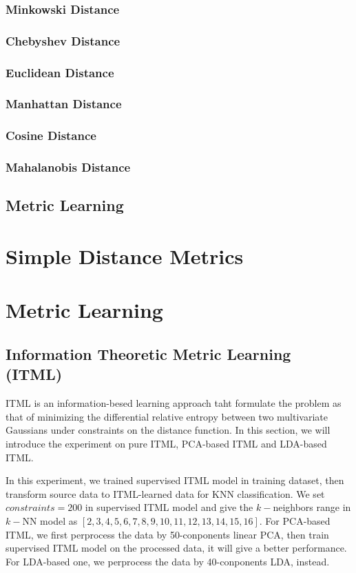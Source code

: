 \documentclass[conference]{IEEEtran}
\begin{document}
\subsubsection{Minkowski Distance}
\subsubsection{Chebyshev Distance}
\subsubsection{Euclidean Distance}
\subsubsection{Manhattan Distance}
\subsubsection{Cosine Distance}
\subsubsection{Mahalanobis Distance}
\subsection{Metric Learning}
\section{Simple Distance Metrics}
\section{Metric Learning}
\subsection{Information Theoretic Metric Learning (ITML)}
ITML is an information-besed learning approach taht formulate the problem as that of minimizing the differential relative entropy between two multivariate Gaussians under constraints on the distance function\cite{Davis2007Information}. In this section, we will introduce the experiment on pure ITML, PCA-based ITML and LDA-based ITML.

In this experiment, we trained supervised ITML model in training dataset, then transform source data to ITML-learned data for KNN classification. We set $constraints=200$ in supervised ITML model and give the $k-$neighbors range in $k-$NN model as $[2, 3, 4, 5, 6, 7, 8, 9, 10, 11, 12, 13, 14, 15, 16]$. For PCA-based ITML, we first perprocess the data by 50-conponents linear PCA, then train supervised ITML model on the processed data, it will give a better performance. For LDA-based one, we perprocess the data by 40-conponents LDA, instead.
\end{document}
